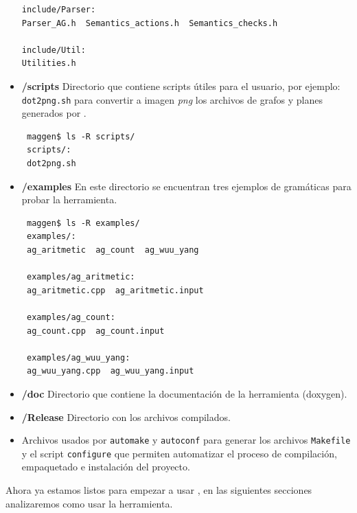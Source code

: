 \begin{itemize}
{\begin{verbatim}
include/Parser:
Parser_AG.h  Semantics_actions.h  Semantics_checks.h

include/Util:
Utilities.h
\end{verbatim}}

\item \textbf{/scripts} Directorio que contiene scripts útiles para el usuario, por ejemplo: \texttt{dot2png.sh} para convertir a imagen \textit{png} los archivos de grafos y planes generados por \maggen.
{\footnotesize \begin{verbatim}
 maggen$ ls -R scripts/
 scripts/:
 dot2png.sh
\end{verbatim} }
 
\item \textbf{/examples} En este directorio se encuentran tres ejemplos de gramáticas para probar la herramienta.
{\footnotesize \begin{verbatim}
 maggen$ ls -R examples/
 examples/:
 ag_aritmetic  ag_count  ag_wuu_yang

 examples/ag_aritmetic:
 ag_aritmetic.cpp  ag_aritmetic.input

 examples/ag_count:
 ag_count.cpp  ag_count.input

 examples/ag_wuu_yang:
 ag_wuu_yang.cpp  ag_wuu_yang.input
\end{verbatim} }

\item \textbf{/doc} Directorio que contiene la documentación de la herramienta (doxygen).
\item \textbf{/Release} Directorio con los archivos compilados.
\item Archivos usados por \texttt{automake} y \texttt{autoconf} para generar los archivos \texttt{Makefile} y el script \texttt{configure} que permiten automatizar el proceso de compilación, empaquetado e instalación del proyecto.
\end{itemize}

Ahora ya estamos listos para empezar a usar \maggen, en las siguientes secciones analizaremos como usar la herramienta.

